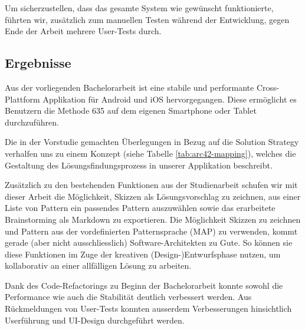 Um sicherzustellen, dass das gesamte System wie gewünscht funktionierte, führten wir, zusätzlich zum manuellen Testen während der Entwicklung, gegen Ende der Arbeit mehrere User-Tests durch.

\subsection{Ergebnisse}
Aus der vorliegenden Bachelorarbeit ist eine stabile und performante Cross-Plattform Applikation für Android und iOS hervorgegangen. Diese ermöglicht es Benutzern die Methode 635 auf dem eigenen Smartphone oder Tablet durchzuführen.

Die in der Vorstudie gemachten Überlegungen in Bezug auf die Solution Strategy verhalfen uns zu einem Konzept (siehe Tabelle \ref{tab:arc42-mapping}), welches die Gestaltung des Lösungs\-findungs\-prozess in unserer Applikation beschreibt.  

Zusätzlich zu den bestehenden Funktionen aus der Studienarbeit schufen wir mit dieser Arbeit die Möglichkeit, Skizzen als Lösungsvorschlag zu zeichnen, aus einer Liste von Pattern ein passendes Pattern auszuwählen sowie das erarbeitete Brainstorming als Markdown zu exportieren. Die Möglichkeit Skizzen zu zeichnen und Pattern aus der vordefinierten Patternsprache (MAP) zu verwenden, kommt gerade (aber nicht ausschliesslich) Software-Architekten zu Gute. So können sie diese Funktionen im Zuge der kreativen (Design-)Entwurfsphase nutzen, um kollaborativ an einer allfälligen Lösung zu arbeiten.

Dank des Code-Refactorings zu Beginn der Bachelorarbeit konnte sowohl die Performance wie auch die Stabilität deutlich verbessert werden. Aus Rückmeldungen von User-Tests konnten ausserdem Verbesserungen hinsichtlich Userführung und UI-Design durchgeführt werden.